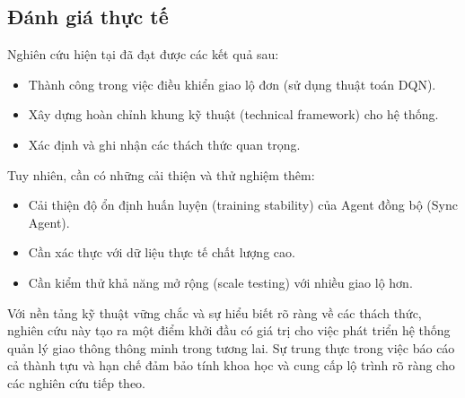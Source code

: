 \subsection{Đánh giá thực tế}
Nghiên cứu hiện tại đã đạt được các kết quả sau:
\begin{itemize}
    \item Thành công trong việc điều khiển giao lộ đơn (sử dụng thuật toán DQN).
    \item Xây dựng hoàn chỉnh khung kỹ thuật (technical framework) cho hệ thống.
    \item Xác định và ghi nhận các thách thức quan trọng.
\end{itemize}
Tuy nhiên, cần có những cải thiện và thử nghiệm thêm:
\begin{itemize}
    \item Cải thiện độ ổn định huấn luyện (training stability) của Agent đồng bộ (Sync Agent).
    \item Cần xác thực với dữ liệu thực tế chất lượng cao.
    \item Cần kiểm thử khả năng mở rộng (scale testing) với nhiều giao lộ hơn.
\end{itemize}

Với nền tảng kỹ thuật vững chắc và sự hiểu biết rõ ràng về các thách thức, nghiên cứu
này tạo ra một điểm khởi đầu có giá trị cho việc phát triển hệ thống quản lý giao thông thông minh
trong tương lai. Sự trung thực trong việc báo cáo cả
thành tựu và hạn chế đảm bảo tính khoa học và cung cấp lộ trình rõ ràng
cho các nghiên cứu tiếp theo.